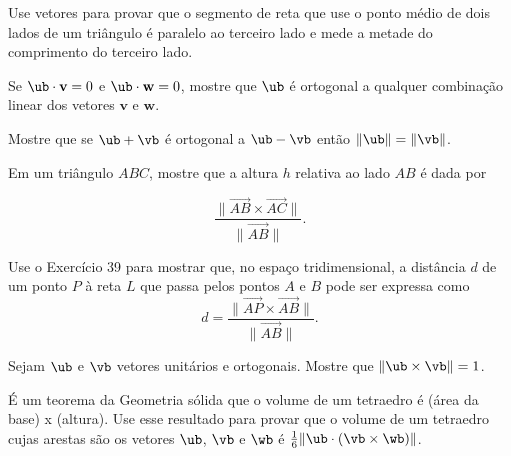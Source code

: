 \item Use vetores para provar que o segmento de reta que use o ponto médio de dois lados de um triângulo é paralelo ao terceiro lado e mede a metade do comprimento do terceiro lado.%
\item Se $\ub\cdot \mathbf{v}=0$ e $\ub\cdot\mathbf{w}=0$, mostre que $\ub$ é ortogonal a qualquer combinação linear dos vetores $\mathbf{v}$ e $\mathbf{w}$.
\item Mostre que se $\ub+\vb$ é ortogonal a $\ub-\vb$ então $\|\ub\|=\|\vb\|$.
\item Em um triângulo $ABC$, mostre que a altura $h$ relativa ao lado $AB$ é dada por

$$\frac{\|\overrightarrow{AB}\times \overrightarrow{AC}\|}{\|\overrightarrow{AB}\|}.$$
\item Use o Exercício 39 para mostrar que, no espaço tridimensional, a distância $d$ de um ponto $P$ à reta $L$ que passa pelos pontos $A$ e $B$ pode ser expressa como
$$d = \frac{\|\overrightarrow{AP}\times \overrightarrow{AB}\|}{\|\overrightarrow{AB}\|}.$$
\item Sejam $\ub$ e $\vb$ vetores unitários e ortogonais. Mostre que $\|\ub\times \vb\|=1$.
\item É um teorema da Geometria sólida que o volume de um tetraedro é (área da base) x (altura). Use esse resultado para provar
que o volume de um tetraedro cujas arestas são os vetores $\ub$, $\vb$ e $\wb$ é $\frac{1}{6}\|\ub\cdot(\vb\times\wb)\|$.


